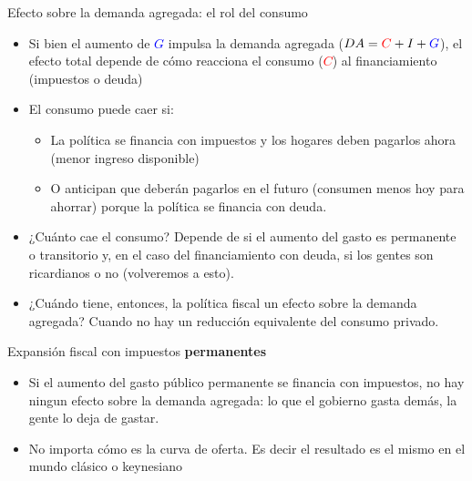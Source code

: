 \documentclass{beamer}
\begin{document}
\begin{frame}{Efecto sobre la demanda agregada: el rol del consumo}
    \begin{itemize}
        \item Si bien el aumento de \textcolor{blue}{$G$} impulsa la demanda agregada ($DA= \textcolor{red}{C}+ I+ \textcolor{blue}{G}$), el efecto total depende de cómo reacciona el consumo (\textcolor{red}{$C$}) al financiamiento (impuestos o deuda)
        \item El consumo puede caer si:
        \begin{itemize}
            \item La política se financia con impuestos y los hogares deben pagarlos ahora (menor ingreso disponible)
            \item O anticipan que deberán pagarlos en el futuro (consumen menos hoy para ahorrar) porque la política se financia con deuda. 
        \end{itemize}
        \item ¿Cuánto cae el consumo? Depende de si el aumento del gasto es permanente o transitorio y, en el caso del financiamiento con deuda, si los gentes son ricardianos o no (volveremos a esto).
        \item ¿Cuándo tiene, entonces, la política fiscal un efecto sobre la demanda agregada? Cuando no hay un reducción equivalente del consumo privado. 
    \end{itemize}
\end{frame}

\begin{frame}{Expansión fiscal con impuestos \textbf{permanentes}}
   \begin{itemize}
       \item Si el aumento del gasto público permanente se financia con impuestos, no hay ningun efecto sobre la demanda agregada: lo que el gobierno gasta demás, la gente lo deja de gastar.
       \item No importa cómo es la curva de oferta. Es decir el resultado es el mismo en el mundo clásico o keynesiano
   \end{itemize}
\end{frame}
\end{document}

